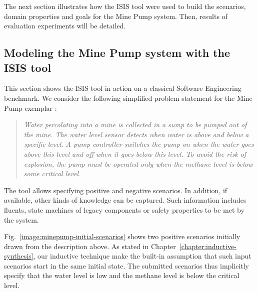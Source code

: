 The next section illustrates how the ISIS tool were used to build the scenarios, domain properties and goals for the Mine Pump system. Then, results of evaluation experiments will be detailed.

\subsection{Modeling the Mine Pump system with the ISIS tool\label{subsection:evaluation-isis-modeling-session}}

This section shows the ISIS tool in action on a classical Software Engineering benchmark. We consider the following simplified problem statement for the Mine Pump exemplar \cite{Joseph:1996}:
\begin{quotation}
\emph{Water percolating into a mine is collected in a sump to be pumped out of the mine. The water level sensor detects when water is above and below a specific level. A pump controller switches the pump on when the water goes above this level and off when it goes below this level. To avoid the risk of explosion, the pump must be operated only when the methane level is below some critical level.}
\end{quotation}

The tool allows specifying positive and negative scenarios. In addition, if available, other kinds of knowledge can be captured. Such information includes fluents, state machines of legacy components or safety properties to be met by the system.

Fig.~\ref{image:minepump-initial-scenarios} shows two positive scenarios initially drawn from the description above. As stated in Chapter~\ref{chapter:inductive-synthesis}, our inductive technique make the built-in assumption that such input scenarios start in the same initial state. The submitted scenarios thus implicitly specify that the water level is low and the methane level is below the critical level. 

